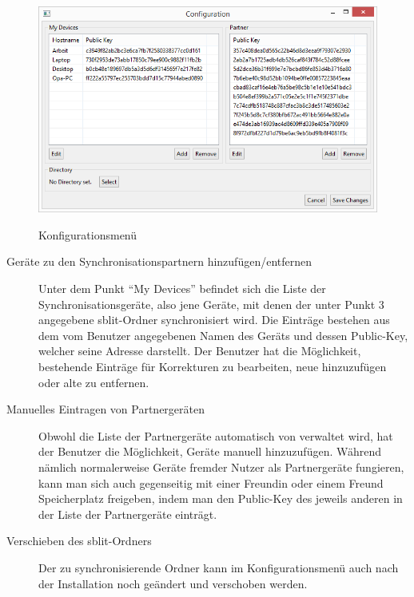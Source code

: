 \begin{figure}[H]
	\centering
	\includegraphics[]{images/config_gui.png}
	\label{ueberblicksfenster}
  \caption{Konfigurationsmenü}
\end{figure}
\begin{description}

	\item[{Geräte zu den Synchronisationspartnern hinzufügen/entfernen}]
		Unter dem Punkt “My Devices” befindet sich die Liste der
		Synchronisationsgeräte, also jene Geräte, mit denen der unter Punkt 3
		angegebene sblit-Ordner synchronisiert wird. Die Einträge
		bestehen aus dem vom Benutzer angegebenen Namen des Geräts und dessen
		Public-Key, welcher seine Adresse darstellt. Der Benutzer hat die
		Möglichkeit, bestehende Einträge für Korrekturen zu bearbeiten, neue
		hinzuzufügen oder alte zu entfernen.

	\item[{Manuelles Eintragen von Partnergeräten}]
		Obwohl die Liste der Partnergeräte automatisch von \sblit verwaltet wird,
		hat der Benutzer die Möglichkeit, Geräte manuell hinzuzufügen. Während
		nämlich normalerweise Geräte fremder Nutzer als Partnergeräte fungieren,
		kann man sich auch gegenseitig mit einer Freundin oder einem Freund
		Speicherplatz freigeben, indem man den Public-Key des jeweils anderen in der
		Liste der Partnergeräte einträgt.

	\item[{Verschieben des sblit-Ordners}]
		Der zu synchronisierende Ordner kann im Konfigurationsmenü auch nach der
		Installation noch geändert und verschoben werden.

\end{description}

